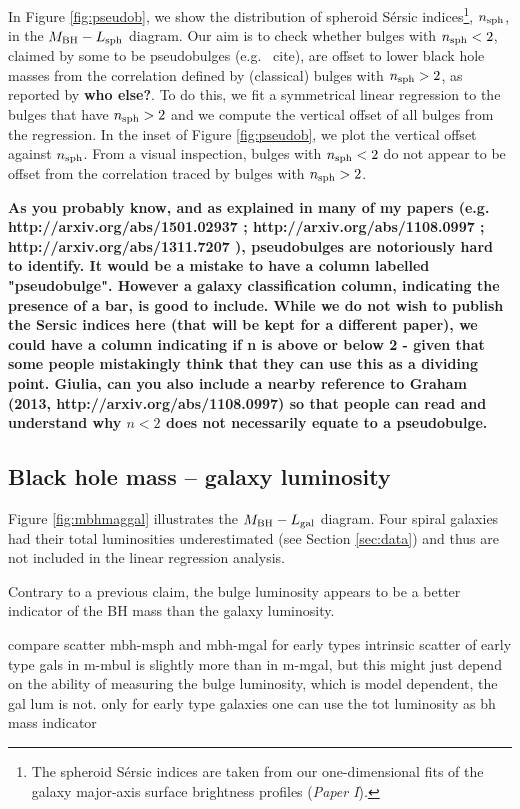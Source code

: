 \documentclass[preprint2]{emulateapj}
\begin{document}
In Figure \ref{fig:pseudob}, we show the distribution of spheroid S\'ersic indices\footnote{The spheroid S\'ersic indices 
are taken from our one-dimensional fits of the galaxy major-axis surface brightness profiles (\emph{Paper I}).}, 
$n_{\rm sph}$, in the $M_{\rm BH} - L_{\rm sph}$ diagram.
Our aim is to check whether bulges with $n_{\rm sph}<2$, claimed by some to be pseudobulges (e.g.~ cite), 
are offset to lower black hole masses from the correlation defined by (classical) bulges with $n_{\rm sph}>2$, 
as reported by \cite{sani2011} {\bf who else?}. 
To do this, we fit a symmetrical linear regression to the bulges that have $n_{\rm sph}>2$ 
and we compute the vertical offset of all bulges from the regression. 
In the inset of Figure \ref{fig:pseudob}, we plot the vertical offset against $n_{\rm sph}$. 
From a visual inspection, bulges with $n_{\rm sph}<2$ do not appear to be offset from the correlation traced by bulges with $n_{\rm sph}>2$.

{\bf As you probably know, and as explained in many of my papers (e.g. http://arxiv.org/abs/1501.02937 ; http://arxiv.org/abs/1108.0997 ; http://arxiv.org/abs/1311.7207 ), 
pseudobulges are notoriously hard to identify.  It would be a mistake to have a column labelled "pseudobulge".   
However a galaxy classification column, indicating the presence of a bar, is good to include.  
While we do not wish to publish the Sersic indices here (that will be kept for a different paper), 
we could have a column indicating if n is above or below 2 - given that some people mistakingly think that they can use this as a dividing point. 
Giulia, can you also include a nearby reference to Graham (2013, http://arxiv.org/abs/1108.0997) so that people can read and understand why $n < 2$ 
does not necessarily equate to a pseudobulge. }


\subsection{Black hole mass -- galaxy luminosity}
Figure \ref{fig:mbhmaggal} illustrates the $M_{\rm BH} - L_{\rm gal}$ diagram.
Four spiral galaxies had their total luminosities underestimated (see Section \ref{sec:data}) 
and thus are not included in the linear regression analysis. 
\cite{lasker2014anal} 

Contrary to a previous claim, the bulge luminosity appears to be a better indicator of the BH mass than the galaxy luminosity.

compare scatter mbh-msph and mbh-mgal for early types
intrinsic scatter of early type gals in m-mbul is slightly more than in m-mgal, but this might just depend 
on the ability of measuring the bulge luminosity, which is model dependent, the gal lum is not.
only for early type galaxies one can use the tot luminosity as bh mass indicator
\end{document}
